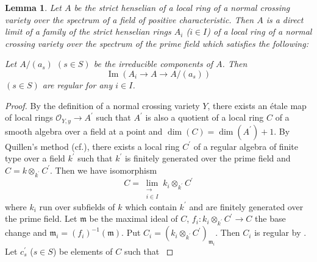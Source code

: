 \documentclass{article}
\newtheorem{lem}[thm]{\indent \sc Lemma}
\begin{document}
%
\begin{lem}\upshape\label{limnc}
Let $A$ be the strict henselian of
a local ring of a normal crossing variety over the spectrum of a field 
of positive characteristic. Then $A$
is a direct limit of a family of 
the strict henselian rings $A_{i}$ ($i\in I$) of a local ring of a normal crossing variety over 
the spectrum of the prime field
which satisfies the following:

Let $A/(a_{s})$ $(s\in S)$ be the irreducible components of $A$. Then
%
\begin{equation*}
\operatorname{Im}(
A_{i}\to 
A\to
A/(a_{s})
)    
\end{equation*}
%
$(s\in S)$ are regular for any $i\in I$.
\end{lem}
%

%
\begin{proof}\upshape
By the definition of a normal crossing variety $Y$, there exists 
an \'{e}tale map of local rings 
$\mathcal{O}_{Y, y}\to A^{\prime}$ such that $A^{\prime}$ is also
a quotient of a local ring $C$ of a smooth algebra over a field at a point
and
$\operatorname{dim}(C)=\operatorname{dim}(A^{\prime})+1$.
By Quillen's method 
(cf.\cite[\S 7, The proof of Theorem 5.11]{Q}),
there exists a local ring $C^{\prime}$ of a regular algebra
of finite type over a field $k^{\prime}$ such that $k^{\prime}$
is finitely generated over the prime field and
%
\begin{math}
C=k\otimes_{k^{\prime}}C^{\prime}.    
\end{math}
%
Then we have isomorphism
%
\begin{equation*}
C=\displaystyle\lim_{
\substack{\to\\ i\in I}
}
k_{i}\otimes_{k^{\prime}}C^{\prime}
\end{equation*}
%
where $k_{i}$ run over  subfields of $k$ which contain
$k^{\prime}$ and are finitely generated over the prime field. Let
%
$\mathfrak{m}$ be the maximal ideal of $C$,
$f_{i}: k_{i}\otimes_{k^{\prime}}C^{\prime}\to C$ 
the base change
and
%
\begin{math}
\mathfrak{m}_{i}
=(f_{i})^{-1}(\mathfrak{m}).
\end{math}
%
Put
%
\begin{math}
C_{i}=\left(
k_{i}\otimes_{k^{\prime}}C^{\prime}
\right)_{\mathfrak{m}_{i}}.
\end{math}
%
Then $C_{i}$ is regular by \cite[p.182, Theorem 23.7 (i)]{Ma}. 
Let $c^{\prime}_{s}$ ($s\in S$) be elements of $C$
such that
%
\begin{math}

\end{math}
\end{proof}
\end{document}

